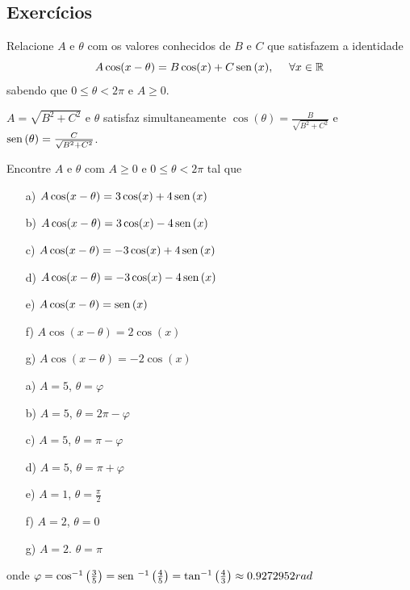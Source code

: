 \subsection*{Exercícios}
\begin{exer}
Relacione $A$ e $\theta$ com os valores conhecidos de $B$ e $C$ que satisfazem a identidade
\begin{equation}A\cos(x-\theta)=B\cos(x)+C\operatorname{sen}\,(x),~~~~\forall x\in\mathbb{R}\end{equation}
sabendo que $0\leq \theta<2\pi$ e $A\geq 0$.
\end{exer}
\begin{resp}
$A=\sqrt{B^2+C^2}$ e $\theta$ satisfaz simultaneamente $\cos(\theta)=\frac{B}{\sqrt{B^2+C^2}}$ e $\operatorname{sen}\,(\theta)=\frac{C}{\sqrt{B^2+C^2}}$.
\end{resp}
\begin{exer} Encontre $A$ e $\theta$ com $A\geq 0$ e  $0\leq \theta<2\pi$ tal que
\begin{itemize}
 \item [a)] $A\cos(x-\theta)=3\cos(x)+4\operatorname{sen}\,(x)$
 \item [b)] $A\cos(x-\theta)=3\cos(x)-4\operatorname{sen}\,(x)$
 \item [c)] $A\cos(x-\theta)=-3\cos(x)+4\operatorname{sen}\,(x)$
 \item [d)] $A\cos(x-\theta)=-3\cos(x)-4\operatorname{sen}\,(x)$
 \item [e)] $A\cos(x-\theta)=\operatorname{sen}\,(x)$
 \item [f)] $A\cos(x-\theta)=2\cos(x)$
 \item [g)] $A\cos(x-\theta)=-2\cos(x)$
 \end{itemize}
\end{exer}
\begin{resp}
\begin{itemize}
 \item [a)] $A=5$, $\theta=\varphi$
 \item [b)] $A=5$, $\theta=2\pi-\varphi$
 \item [c)] $A=5$, $\theta=\pi-\varphi$
 \item [d)] $A=5$, $\theta=\pi+\varphi$
 \item [e)] $A=1$, $\theta=\frac{\pi}{2}$
 \item [f)] $A=2$, $\theta=0$
 \item [g)] $A=2$. $\theta=\pi$
 \end{itemize}
 onde $\varphi=\cos^{-1}\left(\frac{3}{5}\right)=\operatorname{sen}\,^{-1}\left(\frac{4}{5}\right)=\tan^{-1}\left(\frac{4}{3}\right)\approx 0.9272952rad $
\end{resp}
